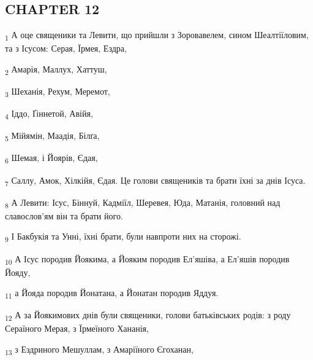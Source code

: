 \subsection{CHAPTER 12}
\begin{tcolorbox}
\textsubscript{1} А оце священики та Левити, що прийшли з Зоровавелем, сином Шеалтіїловим, та з Ісусом: Серая, Їрмея, Ездра,
\end{tcolorbox}
\begin{tcolorbox}
\textsubscript{2} Амарія, Маллух, Хаттуш,
\end{tcolorbox}
\begin{tcolorbox}
\textsubscript{3} Шеханія, Рехум, Меремот,
\end{tcolorbox}
\begin{tcolorbox}
\textsubscript{4} Іддо, Ґіннетой, Авійя,
\end{tcolorbox}
\begin{tcolorbox}
\textsubscript{5} Мійямін, Маадія, Білґа,
\end{tcolorbox}
\begin{tcolorbox}
\textsubscript{6} Шемая, і Йоярів, Єдая,
\end{tcolorbox}
\begin{tcolorbox}
\textsubscript{7} Саллу, Амок, Хілкійя, Єдая. Це голови священиків та брати їхні за днів Ісуса.
\end{tcolorbox}
\begin{tcolorbox}
\textsubscript{8} А Левити: Ісус, Біннуй, Кадміїл, Шеревея, Юда, Матанія, головний над славослов'ям він та брати його.
\end{tcolorbox}
\begin{tcolorbox}
\textsubscript{9} І Бакбукія та Унні, їхні брати, були навпроти них на сторожі.
\end{tcolorbox}
\begin{tcolorbox}
\textsubscript{10} А Ісус породив Йоякима, а Йояким породив Ел'яшіва, а Ел'яшів породив Йояду,
\end{tcolorbox}
\begin{tcolorbox}
\textsubscript{11} а Йояда породив Йонатана, а Йонатан породив Яддуя.
\end{tcolorbox}
\begin{tcolorbox}
\textsubscript{12} А за Йоякимових днів були священики, голови батьківських родів: з роду Сераїного Мерая, з Їрмеїного Хананія,
\end{tcolorbox}
\begin{tcolorbox}
\textsubscript{13} з Ездриного Мешуллам, з Амаріїного Єгоханан,
\end{tcolorbox}

